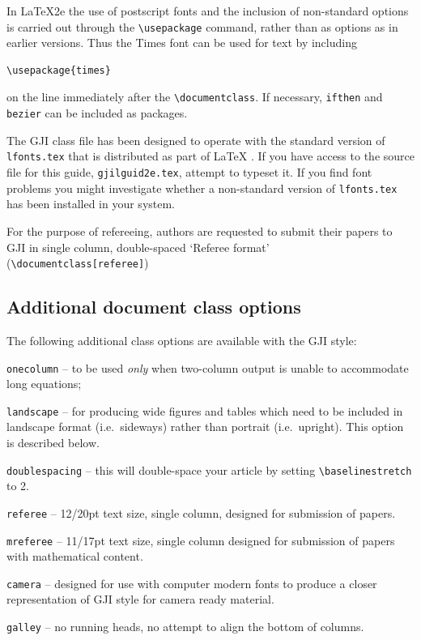 \documentclass{gji}
\begin{document}
In \LaTeX2e the use of postscript fonts and the inclusion of non-standard
options is carried out through the \verb"\usepackage" command, rather than
as options as in earlier versions.  Thus the Times font can be used for
text by including
\begin{verbatim}
\usepackage{times}
\end{verbatim}
on the line immediately after the \verb"\documentclass". If necessary,
\texttt{ifthen} and \texttt{bezier} can be included as packages.

The GJI class file has been designed to operate with the standard
version of \verb"lfonts.tex" that is distributed as part of \LaTeX
. If you have access to the source file for this guide,
\verb"gjilguid2e.tex", attempt to typeset it.  If you find font
problems you might investigate whether a non-standard version of
\verb"lfonts.tex" has been installed in your system.


For the purpose of refereeing, authors are requested to submit their papers to GJI in single column, double-spaced `Referee format' (\verb"\documentclass[referee]")

\subsection{Additional document class options}\label{classoptions}

The following additional class options are available with the GJI style:
\begin{description}
  \item \texttt{onecolumn} -- to be used \textit{only} when two-column output
        is unable to accommodate long equations;
  \item \texttt{landscape} -- for producing wide figures and tables which
        need to be included in landscape format (i.e.\ sideways) rather
        than portrait (i.e.\ upright). This option is described below.
  \item \texttt{doublespacing} -- this will double-space your
        article by setting \verb"\baselinestretch" to 2.
  \item \texttt{referee} -- 12/20pt text size, single column,
        designed for submission of papers.
  \item \texttt{mreferee} -- 11/17pt text size, single column
        designed for submission of papers with mathematical content.
  \item \texttt{camera} -- designed for use with computer modern fonts to
        produce a closer representation of GJI style for camera
        ready material.
  \item \texttt{galley} -- no running heads, no attempt to align
        the bottom of columns.
\end{description}
\end{document}
